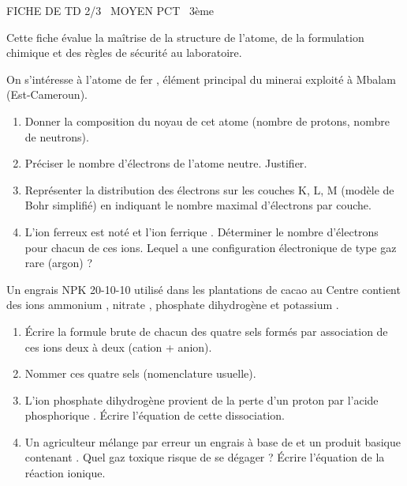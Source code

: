\documentclass[11pt]{article}
\begin{document}
\begin{tcolorbox}[enhanced,colback=popink,colframe=popink,arc=10pt,boxrule=0pt,left=12pt,right=12pt,top=9pt,bottom=9pt]
{\color{white}\popxbold\small FICHE DE TD 2/3 \textbullet\ MOYEN \hfill PCT \textbullet\ 3ème\par}
\end{tcolorbox}
\vspace{4pt}
Cette fiche évalue la maîtrise de la structure de l'atome, de la formulation chimique et des règles de sécurité au laboratoire.

\begin{exercice}
On s'intéresse à l'atome de fer , élément principal du minerai exploité à Mbalam (Est-Cameroun).
\begin{enumerate}
    \item Donner la composition du noyau de cet atome (nombre de protons, nombre de neutrons).
    \item Préciser le nombre d'électrons de l'atome neutre. Justifier.
    \item Représenter la distribution des électrons sur les couches K, L, M (modèle de Bohr simplifié) en indiquant le nombre maximal d'électrons par couche.
    \item L'ion ferreux est noté  et l'ion ferrique . Déterminer le nombre d'électrons pour chacun de ces ions. Lequel a une configuration électronique de type gaz rare (argon) ?
\end{enumerate}
\end{exercice}

\begin{exercice}
Un engrais NPK 20-10-10 utilisé dans les plantations de cacao au Centre contient des ions ammonium , nitrate , phosphate dihydrogène  et potassium .
\begin{enumerate}
    \item Écrire la formule brute de chacun des quatre sels formés par association de ces ions deux à deux (cation + anion).
    \item Nommer ces quatre sels (nomenclature usuelle).
    \item L'ion phosphate dihydrogène  provient de la perte d'un proton par l'acide phosphorique . Écrire l'équation de cette dissociation.
    \item Un agriculteur mélange par erreur un engrais à base de  et un produit basique contenant . Quel gaz toxique risque de se dégager ? Écrire l'équation de la réaction ionique.
\end{enumerate}
\end{exercice}
\end{document}
